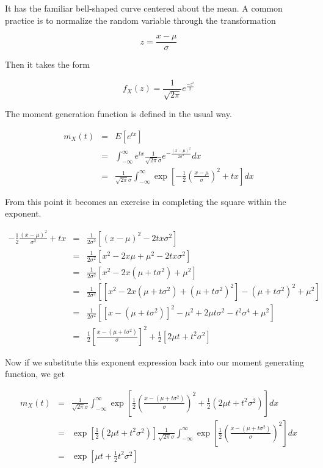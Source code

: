 \documentclass[]{article}
\begin{document}
It has the familiar bell-shaped curve centered about the mean.
A common practice is to normalize the random variable through
the transformation

$$
z = \frac{x - \mu}{\sigma}
$$

Then it takes the form

\begin{equation}
f_X(z) = \frac{1}{\sqrt{2\pi}}e^\frac{-z^2}{2}
\end{equation}

The moment generation function is defined in the usual way.

\begin{eqnarray*}
m_X(t) &= &E \left[ e^{tx}\right] \\
  &= &\int_{-\infty}^{\infty} e^{tx} \frac{1}{\sqrt{2\pi}\sigma} 
         e^{-\frac{(x-\mu)^2}{2\sigma^2}} dx \\
  &= &\frac{1}{\sqrt{2\pi} \sigma} \int_{-\infty}^{\infty}
       \exp \left[ -\frac{1}{2} \left( \frac{x-\mu}{\sigma} \right)^2 + tx \right] dx
\end{eqnarray*}

From this point it becomes an exercise in completing the square within
the exponent.

\begin{eqnarray*}
-\frac{1}{2} \frac{(x-\mu)^2}{\sigma^2} + tx & = & \frac{1}{2\sigma^2} \left[
      (x-\mu)^2 - 2tx\sigma^2 \right] \\
   &= &\frac{1}{2\sigma^2} \left[ x^2 - 2x\mu + \mu^2 - 2tx\sigma^2 \right] \\
   &= &\frac{1}{2\sigma^2} \left[ x^2 - 2x(\mu + t\sigma^2) + \mu^2 \right] \\
   &= &\frac{1}{2\sigma^2} \left[ [ x^2 - 2x(\mu + t\sigma^2) + (\mu + t\sigma^2)^2 ]
       - (\mu + t\sigma^2)^2 + \mu^2 \right] \\
   &= &\frac{1}{2\sigma^2} \left[ [x - (\mu + t\sigma^2)]^2
       - \mu^2 + 2\mu t \sigma^2 - t^2 \sigma^4 + \mu^2 \right] \\
   &= &\frac{1}{2} \left[ \frac{x - (\mu + t\sigma^2)}{\sigma} \right]^2
      +\frac{1}{2} \left[ 2\mu t + t^2 \sigma^2 \right]
\end{eqnarray*}

Now if we substitute this exponent expression back into our moment
generating function, we get

\begin{eqnarray}
m_X(t) &= &\frac{1}{\sqrt{2\pi} \sigma} \int_{-\infty}^{\infty} \exp \left[
   \frac{1}{2} \left( \frac{x - (\mu + t\sigma^2)}{\sigma} \right)^2
      +\frac{1}{2} ( 2\mu t + t^2 \sigma^2) \right] dx  \nonumber \\
  &= &\exp \left[ \frac{1}{2} ( 2\mu t + t^2 \sigma^2) \right] \frac{1}{\sqrt{2\pi} \sigma} 
   \int_{-\infty}^{\infty} \exp \left[ \frac{1}{2} 
   \left( \frac{x - (\mu + t\sigma^2)}{\sigma} \right)^2 \right] dx \nonumber \\
  &= & \exp \left[\mu t + \frac{1}{2}t^2 \sigma^2 \right] \label{norm_mgf}
\end{eqnarray}
\end{document}
